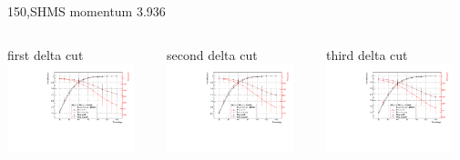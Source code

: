 \documentclass[aspectratio=169,xcolor=dvipsnames]{beamer}
\begin{document}
\begin{frame}{150,SHMS momentum 3.936}
\begin{columns}
\begin{column}[T]{0.3\textwidth}
first delta cut \\
\includegraphics[width = 0.9\textwidth]{results/pid/SHMS_rf_150_0.pdf}
\end{column}
\begin{column}[T]{0.3\textwidth}
second delta cut \\
\includegraphics[width = 0.9\textwidth]{results/pid/SHMS_rf_150_1.pdf}
\end{column}
\begin{column}[T]{0.3\textwidth}
third delta cut \\
\includegraphics[width = 0.9\textwidth]{results/pid/SHMS_rf_150_2.pdf}

\end{column}
\end{columns}
\end{frame}
\end{document}
